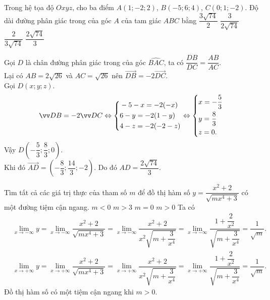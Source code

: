 \begin{ex}%
 Trong hệ tọa độ $Oxyz$, cho ba điểm $A(1;-2;2)$, $B(-5;6;4)$, $C(0;1;-2)$. Độ dài đường phân giác trong  của góc $A$ của tam giác $ABC$ bằng
 \choice
  {$\dfrac{3 \sqrt{74}}{2}$}
  {$\dfrac{3}{2 \sqrt{74}}$}
  {$\dfrac{2}{3 \sqrt{74}}$}
  {\True $\dfrac{2 \sqrt{74}}{3}$}
 \loigiai
  {
  \immini
   {
   Gọi $D$ là chân đường phân giác trong của góc $\widehat{BAC}$, ta có $\dfrac{DB}{DC} = \dfrac{AB}{AC}$.\\
   Lại có $AB = 2\sqrt{26}$ và $AC = \sqrt{26}$ nên $\vec{DB} = -2 \vec{DC}$.\\
   Gọi $D(x;y;z)$.
   \begin{align*}
    \vec{DB} = -2 \vec{DC} \Leftrightarrow \heva{& -5-x = -2(-x) \\& 6-y = -2(1-y) \\& 4-z = -2(-2-z)} \Leftrightarrow \heva{& x = -\dfrac{5}{3} \\& y = \dfrac{8}{3} \\& z = 0.}
   \end{align*}
   Vậy $D \left( -\dfrac{5}{3}; \dfrac{8}{3}; 0 \right)$.\\
   Khi đó $\vec{AD} = \left( -\dfrac{8}{3}; \dfrac{14}{3}; -2 \right)$. Do đó $AD = \dfrac{2\sqrt{74}}{3}$.
   }
   {
   }
  }
\end{ex}

\begin{ex}%
 Tìm tất cả các giá trị thực của tham số $m$ để đồ thị hàm số $y = \dfrac{x^2 + 2}{\sqrt{mx^4 + 3}}$ có một đường tiệm cận ngang.
 \choice
  {$m < 0$}
  {$m > 3$}
  {$m = 0$}
  {\True $m > 0$}
 \loigiai
  {
  Ta có
  \begin{align*}
   & \lim\limits_{x \to -\infty} y = \lim\limits_{x \to -\infty} \dfrac{x^2 + 2}{\sqrt{mx^4 + 3}} = \lim\limits_{x \to -\infty} \dfrac{x^2 + 2}{x^2 \sqrt{m + \dfrac{3}{x^4}}} = \lim\limits_{x \to -\infty} \dfrac{1 + \dfrac{2}{x^2}}{\sqrt{m + \dfrac{3}{x^4}}} = \dfrac{1}{\sqrt{m}}. \\
   & \lim\limits_{x \to +\infty} y = \lim\limits_{x \to +\infty} \dfrac{x^2 + 2}{\sqrt{mx^4 + 3}} = \lim\limits_{x \to +\infty} \dfrac{x^2 + 2}{x^2 \sqrt{m + \dfrac{3}{x^4}}} = \lim\limits_{x \to +\infty} \dfrac{1 + \dfrac{2}{x^2}}{\sqrt{m + \dfrac{3}{x^4}}} = \dfrac{1}{\sqrt{m}}.
  \end{align*}
  Đồ thị hàm số có một tiệm cận ngang khi $m > 0$.
  }
\end{ex}

